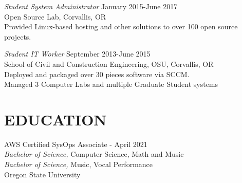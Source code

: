 \documentclass[line,margin]{res}
\begin{document}
\begin{resume}
                    {\sl Student System Administrator} \hfill January 2015-June 2017\\
                    Open Source Lab, 
                    Corvallis, OR\\
                    Provided Linux-based hosting and other solutions to over 100 open source projects.

                    {\sl Student IT Worker} \hfill September 2013-June 2015 \\
                    School of Civil and Construction Engineering, OSU, 
                    Corvallis, OR\\ 
                    Deployed and packaged over 30 pieces software via SCCM.\\
                    Managed 3 Computer Labs and multiple Graduate Student systems

\section{EDUCATION}
                    AWS Certified SysOps Associate - April 2021 \\
                    {\sl Bachelor of Science,} Computer Science, Math and Music \\
                    {\sl Bachelor of Science,} Music, Vocal Performance \\
                    Oregon State University\\
                   
\end{resume}
\end{document}
